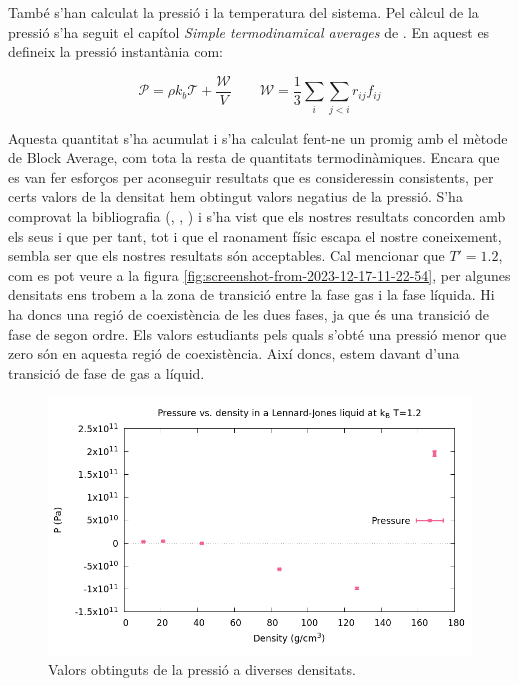 \documentclass[a4paper,10pt]{article}
\begin{document}
També s'han calculat la pressió i la temperatura del sistema. Pel càlcul de la pressió s'ha seguit el capítol \textit{Simple termodinamical averages} de \cite{allen}. En aquest es defineix la pressió instantània com:

$$ \mathcal{P} = \rho k_b \mathcal{T} + \frac{\mathcal{W}}{V} \qquad \mathcal{W} = \frac{1}{3} \sum_i \sum_{j<i} r_{ij} f_{ij} $$ 

Aquesta quantitat s'ha acumulat i s'ha calculat fent-ne un promig amb el mètode de Block Average, com tota la resta de quantitats termodinàmiques. Encara que es van fer esforços per aconseguir resultats que es consideressin consistents, per certs valors de la densitat hem obtingut valors negatius de la pressió. S'ha comprovat la bibliografia (\cite{Hess}, \cite{Gregory}, \cite{HansenVerlet}) i s'ha vist que els nostres resultats concorden amb els seus i que per tant, tot i que el raonament físic escapa el nostre coneixement, sembla ser que els nostres resultats són acceptables. Cal mencionar que $T'=1.2$, com es pot veure a la figura \ref{fig:screenshot-from-2023-12-17-11-22-54}, per algunes densitats ens trobem a la zona de transició entre la fase gas i la fase líquida. Hi ha doncs una regió de coexistència de les dues fases, ja que és una transició de fase de segon ordre. Els valors estudiants pels quals s'obté una pressió menor que zero són en aquesta regió de coexistència. Així doncs, estem davant d'una transició de fase de gas a líquid. 


\begin{figure}
	\centering
	\includegraphics[width=1\linewidth]{preassure}
	\caption{Valors obtinguts de la pressió a diverses densitats.}
	\label{fig:preassure}
\end{figure}
\end{document}
